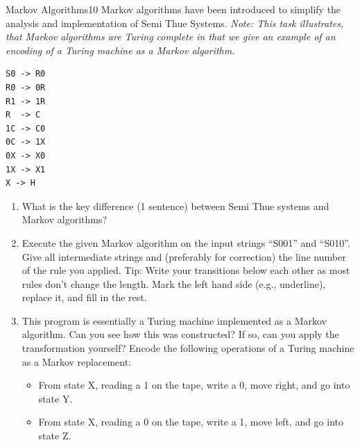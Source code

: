 \documentclass[twoside]{article}
\begin{document}
  \begin{task}{Markov Algorithms}{10}{}
    Markov algorithms have been introduced to simplify the analysis and implementation of Semi Thue Systems. \emph{Note: This task illustrates, that Markov algorithms are Turing complete in that we give an example of an encoding of a Turing machine as a Markov algorithm.}

    \begin{lstlisting}[caption=Implementing a Turing machine as a Markov Algorithm]
S0 -> R0
R0 -> 0R      
R1 -> 1R
R  -> C
1C -> C0
0C -> 1X
0X -> X0
1X -> X1
X -> H 
      \end{lstlisting}
    
    \begin{enumerate}
    \item {What is the key difference (1 sentence) between Semi Thue systems and Markov algorithms?\vspace{2cm}}
    \item{Execute the given Markov algorithm on the input strings ``S001'' and ``S010''. Give all intermediate strings and (preferably for correction) the line number of the rule you applied. Tip: Write your transitions below each other as most rules don't change the length. Mark the left hand side (e.g., underline), replace it, and fill in the rest. \vspace{6cm}}
      \clearpage
    \item{ This program is essentially a Turing machine implemented as a Markov algorithm. Can you see how this was
      constructed? If so, can you apply the transformation yourself? Encode the following operations of a Turing machine as a Markov replacement:
      \begin{itemize}
        \item {From state X, reading a 1 on the tape, write a 0, move right, and go into state Y.\vspace{1cm}} 
        \item {From state X, reading a 0 on the tape, write a 1, move left, and go into state Z.\vspace{1cm}} 
      \end{itemize}
        
      }
    \end{enumerate}
\end{task}
\end{document}
